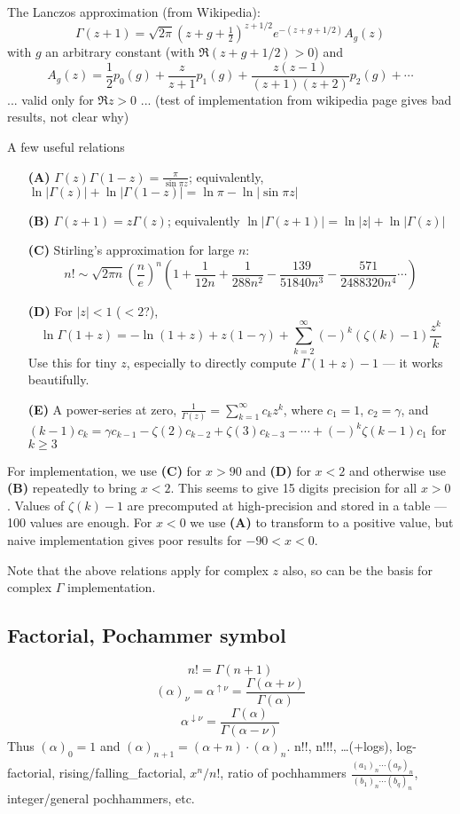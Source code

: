 \documentclass[10pt,dvipdfmx,letterpaper,twoside]{article}
\newenvironment{implementation}{\noindent\begin{framed}}{\end{framed}}
\let\al=\alpha
\let\Gam=\Gamma
\begin{document}
The Lanczos approximation (from Wikipedia):
\[ \Gam(z+1) = \sqrt{2\pi}(z+g+\tfrac12)^{z+1/2} e^{-(z+g+1/2)} A_g(z) \]
with $g$ an arbitrary constant (with $\Re(z+g+1/2)>0$) and
\[ A_g(z) = \frac12 p_0(g) + \frac{z}{z+1} p_1(g) + \frac{z(z-1)}{(z+1)(z+2)} p_2(g) + \cdots \]
... valid only for $\Re z>0$ ... (test of implementation from wikipedia page gives bad results, not clear why)

\begin{implementation}
A few useful relations
\begin{itemize}
\item[\bf(A)] $\Gam(z)\Gam(1-z) = \frac{\pi}{\sin\pi z}$; equivalently, $\ln|\Gam(z)| + \ln|\Gam(1-z)| = \ln\pi - \ln|\sin\pi z|$
\item[\bf(B)] $\Gam(z+1) = z\Gam(z)$; equivalently $\ln|\Gam(z+1)| = \ln|z| + \ln|\Gam(z)|$
\item[\bf(C)] Stirling's approximation for large $n$:
  \[n! \sim \sqrt{2\pi n}\left(\frac{n}{e}\right)^n\left(
      1 + \frac{1}{12 n} + \frac{1}{288 n^2} - \frac{139}{51840 n^3} - \frac{571}{2488320 n^4} \cdots\right)\]
\item[\bf(D)] For $|z|<1$ ($<2$?),
  \[ \ln\Gam(1+z) = -\ln(1+z) + z(1-\gamma) + \sum_{k=2}^\infty(-)^k(\zeta(k)-1)\frac{z^k}{k} \]
  Use this for tiny $z$, especially to directly compute $\Gam(1+z)-1$ --- it works beautifully.
\item[\bf(E)] A power-series at zero, $\frac{1}{\Gam(z)} = \sum_{k=1}^\infty c_k z^k$, where $c_1=1$, $c_2=\gamma$,
  and $(k-1)c_k = \gamma c_{k-1} - \zeta(2) c_{k-2} + \zeta(3) c_{k-3} - \cdots + (-)^k \zeta(k-1) c_1$ for $k\geq3$
\end{itemize}
For implementation, we use {\bf(C)} for $x>90$ and {\bf(D)} for $x<2$ and otherwise use {\bf(B)} repeatedly to bring $x<2$.  This seems to
give 15 digits precision for all $x>0$.  Values of $\zeta(k)-1$ are precomputed at high-precision and stored in a table --- 100 values are enough.
For $x<0$ we use {\bf(A)} to transform to a positive value, but naive implementation gives poor results for $-90<x<0$.

Note that the above relations apply for complex $z$ also, so can be the basis for complex $\Gam$ implementation.
\end{implementation}

\subsection{Factorial, Pochammer symbol}
\[ n! = \Gam(n+1) \]
\[ (\al)_\nu = \al^{\uparrow \nu} = \frac{\Gam(\al+\nu)}{\Gam(\al)} \]
\[ \al^{\downarrow \nu} = \frac{\Gam(\al)}{\Gam(\al-\nu)} \]
Thus $(\al)_0 = 1$ and $(\al)_{n+1} = (\al+n)\cdot(\al)_n$.
n!!, n!!!, \dots (+logs), log-factorial, rising/falling\_factorial, $x^n/n!$,
ratio of pochhammers $\frac{(a_1)_n\cdots(a_p)_n}{(b_1)_n\cdots(b_q)_n}$,
integer/general pochhammers, etc.
\end{document}
